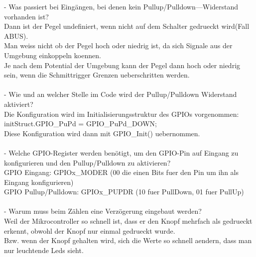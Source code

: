 \documentclass{report}
\begin{document}
- Was passiert bei Eingängen, bei denen kein Pullup/Pulldown—Widerstand vorhanden ist?\\
Dann ist der Pegel undefiniert, wenn nicht auf dem Schalter gedrueckt wird(Fall ABUS).\\
Man weiss nicht ob der Pegel hoch oder niedrig ist, da sich Signale aus der Umgebung einkoppeln koennen.\\
Je nach dem Potential der Umgebung kann der Pegel dann hoch oder niedrig sein, wenn die Schmittrigger Grenzen ueberschritten werden.\\\\
- Wie und an welcher Stelle im Code wird der Pullup/Pulldown Widerstand aktiviert?\\
Die Konfiguration wird im Initialisierungsstruktur des GPIOs vorgenommen:\\
initStruct.GPIO\_PuPd = GPIO\_PuPd\_DOWN;\\
Diese Konfiguration wird dann mit GPIO\_Init() uebernommen.\\\\
- Welche GPIO-Register werden benötigt, um den GPIO-Pin auf Eingang zu konfigurieren und den Pullup/Pulldown zu aktivieren?\\
GPIO Eingang: GPIOx\_MODER (00 die einen Bits fuer den Pin um ihn als Eingang konfigurieren)\\
GPIO Pullup/Pulldown: GPIOx\_PUPDR (10 fuer PullDown, 01 fuer PullUp)\\\\
- Warum muss beim Zählen eine Verzögerung eingebaut werden?\\
Weil der Mikrocontroller so schnell ist, dass er den Knopf mehrfach als gedrueckt erkennt, obwohl der Knopf nur einmal gedrueckt wurde.\\
Bzw. wenn der Knopf gehalten wird, sich die Werte so schnell aendern, dass man nur leuchtende Leds sieht.\\
\end{document}
